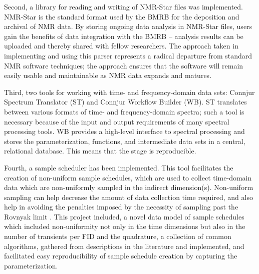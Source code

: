 Second, a library for reading and writing of NMR-Star files was implemented.  
NMR-Star is the standard format used by the BMRB for the deposition and 
archival of NMR data.  By storing ongoing data analysis in NMR-Star files, 
users gain the benefits of data integration with the BMRB -- analysis results 
can be uploaded and thereby shared with fellow researchers.  The approach 
taken in implementing and using this parser represents a radical departure 
from standard NMR software techniques; the approach ensures that the 
software will remain easily usable and maintainable as NMR data expands 
and matures.

Third, two tools for working with time- and frequency-domain data sets:  
Connjur Spectrum Translator (ST) and Connjur Workflow Builder (WB).  ST 
translates between various formats of time- and frequency-domain spectra; 
such a tool is necessary because of the input and output requirements of 
many spectral processing tools.  WB provides a high-level interface to 
spectral processing and stores the parameterization, functions, and 
intermediate data sets in a central, relational database.  This means 
that the stage is reproducible.

Fourth, a sample scheduler has been implemented.  This tool facilitates the 
creation of non-uniform sample schedules, which are used to collect time-domain 
data which are non-uniformly sampled in the indirect dimension(s).  Non-uniform 
sampling can help decrease the amount of data collection time required, and 
also help in avoiding the penalties imposed by the necessity of sampling past 
the Rovnyak limit \cite{rovnyak2004accelerated}.  This project included,
a novel data model of sample schedules which included non-uniformity not 
only in the time dimensions but also in the number of transients per FID and 
the quadrature, 
a collection of common algorithms, gathered from descriptions in the 
literature and implemented,
and facilitated easy reproducibility of sample schedule creation by capturing
the parameterization.


